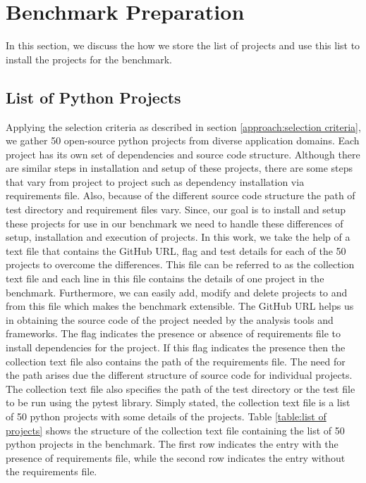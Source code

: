 \section{Benchmark Preparation}
\label{approach:benchmark preparation}
In this section, we discuss the how we store the list of projects and use this list to install the projects for the benchmark. 

\subsection{List of Python Projects}
\label{approach:list of projects}
Applying the selection criteria as described in section \ref{approach:selection criteria}, we gather 50 open-source python projects from diverse application domains. Each project has its own set of dependencies and source code structure.
Although there are similar steps in installation and setup of these projects, there are some steps that vary from project to project such as dependency installation via requirements file.
Also, because of the different source code structure the path of test directory and requirement files vary.
Since, our goal is to install and setup these projects for use in our benchmark we need to handle these differences of setup, installation and execution of projects. 
In this work, we take the help of a text file that contains the GitHub URL, flag and test details for each of the 50 projects to overcome the differences.
This file can be referred to as the collection text file and each line in this file contains the details of one project in the benchmark.
Furthermore, we can easily add, modify and delete projects to and from this file which makes the benchmark extensible.
The GitHub URL helps us in obtaining the source code of the project needed by the analysis tools and frameworks.
The flag indicates the presence or absence of requirements file to install dependencies for the project. If this flag indicates the presence then the collection text file also contains the path of the requirements file. The need for the path arises due the different structure of source code for individual projects.
The collection text file also specifies the path of the test directory or the test file to be run using the pytest library.
Simply stated, the collection text file is a list of 50 python projects with some details of the projects.
Table \ref{table:list of projects} shows the structure of the collection text file containing the list of 50 python projects in the benchmark.
 The first row indicates the entry with the presence of requirements file, while the second row indicates the entry without the requirements file.

